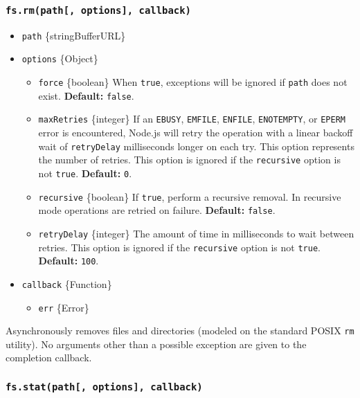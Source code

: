 \subsubsection{\texorpdfstring{\texttt{fs.rm(path{[},\ options{]},\ callback)}}{fs.rm(path{[}, options{]}, callback)}}\label{fs.rmpath-options-callback}

\begin{itemize}
\tightlist
\item
  \texttt{path} \{string\textbar Buffer\textbar URL\}
\item
  \texttt{options} \{Object\}

  \begin{itemize}
  \tightlist
  \item
    \texttt{force} \{boolean\} When \texttt{true}, exceptions will be
    ignored if \texttt{path} does not exist. \textbf{Default:}
    \texttt{false}.
  \item
    \texttt{maxRetries} \{integer\} If an \texttt{EBUSY},
    \texttt{EMFILE}, \texttt{ENFILE}, \texttt{ENOTEMPTY}, or
    \texttt{EPERM} error is encountered, Node.js will retry the
    operation with a linear backoff wait of \texttt{retryDelay}
    milliseconds longer on each try. This option represents the number
    of retries. This option is ignored if the \texttt{recursive} option
    is not \texttt{true}. \textbf{Default:} \texttt{0}.
  \item
    \texttt{recursive} \{boolean\} If \texttt{true}, perform a recursive
    removal. In recursive mode operations are retried on failure.
    \textbf{Default:} \texttt{false}.
  \item
    \texttt{retryDelay} \{integer\} The amount of time in milliseconds
    to wait between retries. This option is ignored if the
    \texttt{recursive} option is not \texttt{true}. \textbf{Default:}
    \texttt{100}.
  \end{itemize}
\item
  \texttt{callback} \{Function\}

  \begin{itemize}
  \tightlist
  \item
    \texttt{err} \{Error\}
  \end{itemize}
\end{itemize}

Asynchronously removes files and directories (modeled on the standard
POSIX \texttt{rm} utility). No arguments other than a possible exception
are given to the completion callback.

\subsubsection{\texorpdfstring{\texttt{fs.stat(path{[},\ options{]},\ callback)}}{fs.stat(path{[}, options{]}, callback)}}\label{fs.statpath-options-callback}

